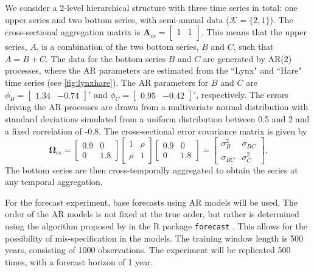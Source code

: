 \documentclass[a4paper,11pt]{article}
\newcommand{\Avet}{\bm{A}}
\newcommand{\Omegavet}{\bm{\Omega}}
\theoremstyle{definition}
\begin{document}
We consider a $2$-level hierarchical structure with three time series in total: one upper series and two bottom series, with semi-annual data ($\mathcal{K} = \{2,1\}$). The cross-sectional aggregation matrix is
$
	\Avet_{cs} = \begin{bmatrix}
		1 & 1 \\
	\end{bmatrix}
$.
This means that the upper series, $A$, is a combination of the two bottom series, $B$ and $C$, such that $A = B+C$.
The data for the bottom series $B$ and $C$ are generated by AR($2$) processes, where the AR parameters are estimated from the “Lynx" and “Hare" time series (see \autoref{fig:lynxhare}). The AR parameters for $B$ and $C$ are
$
	\phi_B = \begin{bmatrix}
		1.34 &
		-0.74
	\end{bmatrix}'$ and $\phi_C = \begin{bmatrix}
		0.95 &
		-0.42
	\end{bmatrix}'
$,
respectively. The errors driving the AR processes are drawn from a multivariate normal distribution with standard deviations simulated from a uniform distribution between 0.5 and 2 and a fixed correlation of -0.8. The cross-sectional error covariance matrix is given by
$$
	\Omegavet_{cs} = \begin{bmatrix}
		0.9 & 0   \\
		0   & 1.8
	\end{bmatrix} \begin{bmatrix}
		1    & \rho \\
		\rho & 1
	\end{bmatrix} \begin{bmatrix}
		0.9 & 0   \\
		0   & 1.8
	\end{bmatrix} = \begin{bmatrix}
		\sigma_B^2  & \sigma_{BC} \\
		\sigma_{BC} & \sigma_C^2
	\end{bmatrix}.
$$
The bottom series are then cross-temporally aggregated to obtain the series at any temporal aggregation.

For the forecast experiment, base forecasts using AR models will be used. The order of the AR models is not fixed at the true order, but rather is determined using the algorithm proposed by \cite{hyndman2008a} in the \textsf{R} package \texttt{forecast} \citep{Rforecast}. This allows for the possibility of mis-specification in the models. The training window length is 500 years, consisting of 1000 observations. The experiment will be replicated 500 times, with a forecast horizon of 1 year.
\end{document}
